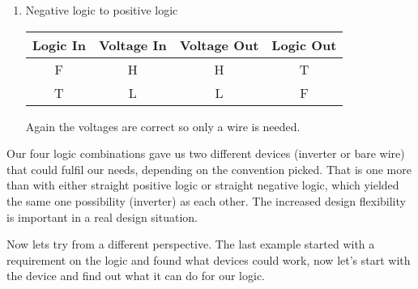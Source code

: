 \begin{example}
\begin{enumerate}
\item Negative logic to positive logic

\begin{tabular}{cc||cc}
Logic In & Voltage In & Voltage Out & Logic Out \\\hline
F        & H          & H           & T         \\
T        & L          & L           & F         \\
\end{tabular}

Again the voltages are correct so only a wire is needed.
\end{enumerate}
Our four logic combinations gave us two different devices (inverter or bare wire) that could fulfil our needs, depending on the convention picked.   That is one more than with either straight positive logic or straight negative logic, which yielded the same one possibility (inverter) as each other.  The increased design flexibility is important in a real design situation.
\end{example}

Now lets try from a different perspective.  The last example started with a requirement on the logic and found what devices could work, now let's start with the device and find out what it can do for our logic.

